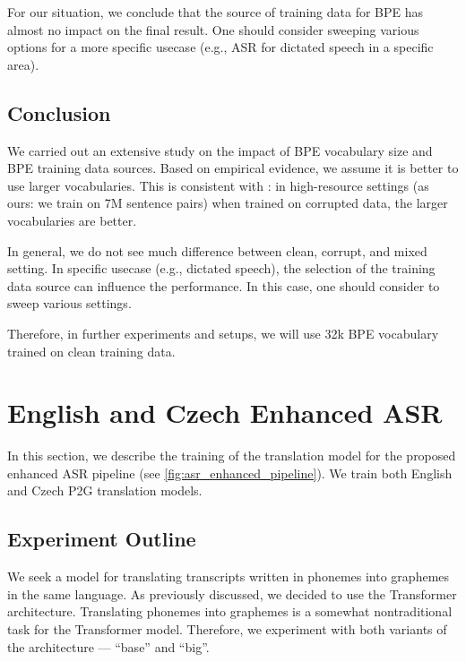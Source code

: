 For our situation, we conclude that the source of training data for BPE has almost no impact on the final result. One should consider sweeping various options for a more specific usecase (e.g., ASR for dictated speech in a specific area).

\subsection{Conclusion}
\label{easr:tok_conclusion}
We carried out an extensive study on the impact of BPE vocabulary size and BPE training data sources. Based on empirical evidence, we assume it is better to use larger vocabularies. This is consistent with : in high-resource settings (as ours: we train on 7M sentence pairs) when trained on corrupted data, the larger vocabularies are better. 

In general, we do not see much difference between clean, corrupt, and mixed setting. In specific usecase (e.g., dictated speech), the selection of the training data source can influence the performance. In this case, one should consider to sweep various settings.

Therefore, in further experiments and setups, we will use 32k BPE vocabulary trained on clean training data.









\section{English and Czech Enhanced ASR}
\label{easr:english}
In this section, we describe the training of the translation model for the proposed enhanced ASR pipeline (see \cref{fig:asr_enhanced_pipeline}). We train both English and Czech P2G translation models.

\subsection{Experiment Outline}
\label{easr:outline}
We seek a model for translating transcripts written in phonemes into graphemes in the same language. As previously discussed, we decided to use the Transformer architecture. Translating phonemes into graphemes is a somewhat nontraditional task for the Transformer model. Therefore, we experiment with both variants of the architecture --- ``base'' and ``big''. 

